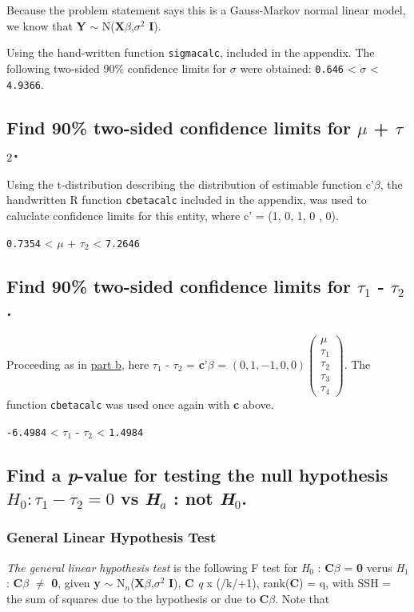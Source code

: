 \documentclass[11pt]{article}
\begin{document}
Because the problem statement says this is a Gauss-Markov normal
linear model, we know that \textbf{Y} $\sim$ N(\textbf{X$\beta$},$\sigma$$^2$ \textbf{I}).

Using the hand-written function \verb~sigmacalc~, included in the
appendix. The following two-sided 90\% confidence limits for $\sigma$ 
were obtained: \texttt{0.646} <
$\sigma$ < \texttt{4.9366}.
\subsection{Find 90\% two-sided confidence limits for $\mu$ + $\tau$$_2$.}
\label{sec-1-2}


Using the t-distribution describing the distribution of estimable
function c'$\beta$, the handwritten R function \verb~cbetacalc~ included in
the appendix, was used to caluclate confidence limits for this
entity, where c' = (1, 0, 1, 0 , 0).

\texttt{0.7354} 
< $\mu$ + $\tau$$_2$ <
\texttt{7.2646}
\subsection{Find 90\% two-sided confidence limits for $\tau$$_1$ - $\tau$$_2$.}
\label{sec-1-3}
\label{Tau1Tau2}

Proceeding as in \hyperref[MuTau2]{part b}, here $\tau$$_1$ - $\tau$$_2$ = \textbf{c}'\textbf{$\beta$} = $(0, 1, -1,
0, 0) \begin{pmatrix} \mu \\ \tau_1 \\ \tau_2
\\ \tau_3 \\ \tau_4 \end{pmatrix}$. The function \verb~cbetacalc~ was used
once again with \textbf{c} above. 

\texttt{-6.4984} 
< $\tau$$_1$ - $\tau$$_2$ <
\texttt{1.4984}
\subsection{Find a \emph{p}-value for testing the null hypothesis $H_0 : \tau_1 - \tau_2 = 0$ vs \emph{H$_a$} : not \emph{H$_0$}.}
\label{sec-1-4}
\subsubsection{General Linear Hypothesis Test}
\label{sec-1-4-1}

\emph{The general linear hypothesis test} is the following F test for
\emph{H$_0$} : \textbf{C$\beta$} = \textbf{0} verus \emph{H$_1$} : \textbf{C$\beta$} $\neq$ \textbf{0}, given \textbf{y}
$\sim$ N$_n$(\textbf{X$\beta$},$\sigma$$^2$ \textbf{I}), \textbf{C} \emph{q} x (/k/+1), rank(\textbf{C}) = q, with SSH = the sum of squares due to
the hypothesis or due to \textbf{C$\beta$}. Note that 
\end{document}
